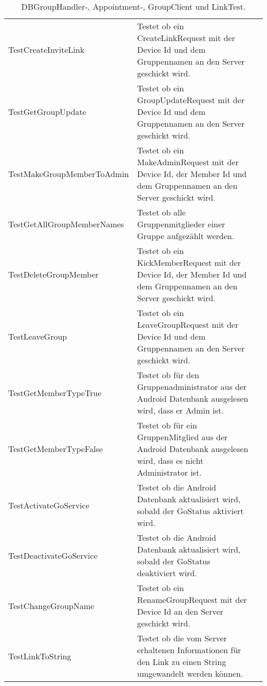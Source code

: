 \begin{table}[H]
{\begin{tabular}{|p{}|p{}|>{\centering}p{}|}
				\hspace{0pt}TestCreateInviteLink & Testet ob ein CreateLinkRequest mit der Device Id und dem Gruppennamen an den Server geschickt wird. & \checkmark\tabularnewline
				\hspace{0pt}TestGetGroupUpdate & Testet ob ein GroupUpdateRequest mit der Device Id und dem Gruppennamen an den Server geschickt wird. & \checkmark\tabularnewline
				\hspace{0pt}TestMakeGroupMemberToAdmin & Testet ob ein MakeAdminRequest mit der Device Id, der Member Id und dem Gruppennamen an den Server geschickt wird. & \checkmark\tabularnewline
				\hspace{0pt}TestGetAllGroupMemberNames & Testet ob alle Gruppenmitglieder einer Gruppe aufgezählt werden. & \checkmark\tabularnewline
				\hspace{0pt}TestDeleteGroupMember & Testet ob ein KickMemberRequest mit der Device Id, der Member Id und dem Gruppennamen an den Server geschickt wird. & \checkmark\tabularnewline
				\hspace{0pt}TestLeaveGroup & Testet ob ein LeaveGroupRequest mit der Device Id und dem Gruppennamen an den Server geschickt wird. & \checkmark\tabularnewline
				\hspace{0pt}TestGetMemberTypeTrue & Testet ob für den Gruppenadministrator aus der Android Datenbank ausgelesen wird, dass er Admin ist. & \checkmark\tabularnewline
				\hspace{0pt}TestGetMemberTypeFalse & Testet ob für ein GruppenMitglied aus der Android Datenbank ausgelesen wird, dass es nicht Administrator ist. & \checkmark\tabularnewline
				\hspace{0pt}TestActivateGoService & Testet ob die Android Datenbank aktualisiert wird, sobald der GoStatus aktiviert wird. & \checkmark\tabularnewline
				\hspace{0pt}TestDeactivateGoService & Testet ob die Android Datenbank aktualisiert wird, sobald der GoStatus deaktiviert wird. & \checkmark\tabularnewline
				\hspace{0pt}TestChangeGroupName & Testet ob ein RenameGroupRequest mit der Device Id an den Server geschickt wird. & \checkmark\tabularnewline

				\hspace{0pt}TestLinkToString & Testet ob die vom Server erhaltenen Informationen für den Link zu einen String umgewandelt werden können. & \checkmark\tabularnewline
				
				\hline
			\end{tabular}}
			\caption{DBGroupHandler-, Appointment-, GroupClient und LinkTest.}
		\end{table}
	
